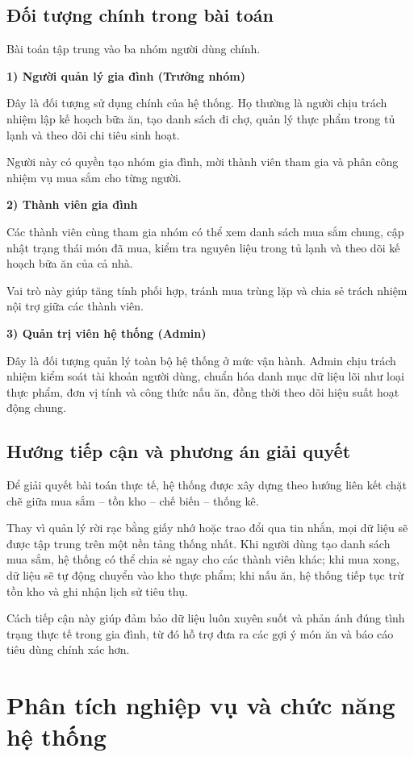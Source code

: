 \documentclass[12pt,a4paper]{report}
\begin{document}
\section{Đối tượng chính trong bài toán}
Bài toán tập trung vào ba nhóm người dùng chính.  

\textbf{1) Người quản lý gia đình (Trưởng nhóm)}  

Đây là đối tượng sử dụng chính của hệ thống. Họ thường là người chịu trách nhiệm lập kế hoạch bữa ăn, tạo danh sách đi chợ, quản lý thực phẩm trong tủ lạnh và theo dõi chi tiêu sinh hoạt.  

Người này có quyền tạo nhóm gia đình, mời thành viên tham gia và phân công nhiệm vụ mua sắm cho từng người.  

\textbf{2) Thành viên gia đình}  

Các thành viên cùng tham gia nhóm có thể xem danh sách mua sắm chung, cập nhật trạng thái món đã mua, kiểm tra nguyên liệu trong tủ lạnh và theo dõi kế hoạch bữa ăn của cả nhà.  

Vai trò này giúp tăng tính phối hợp, tránh mua trùng lặp và chia sẻ trách nhiệm nội trợ giữa các thành viên.  

\textbf{3) Quản trị viên hệ thống (Admin)}  

Đây là đối tượng quản lý toàn bộ hệ thống ở mức vận hành. Admin chịu trách nhiệm kiểm soát tài khoản người dùng, chuẩn hóa danh mục dữ liệu lõi như loại thực phẩm, đơn vị tính và công thức nấu ăn, đồng thời theo dõi hiệu suất hoạt động chung.  

\section{Hướng tiếp cận và phương án giải quyết}
Để giải quyết bài toán thực tế, hệ thống được xây dựng theo hướng liên kết chặt chẽ giữa mua sắm – tồn kho – chế biến – thống kê.  

Thay vì quản lý rời rạc bằng giấy nhớ hoặc trao đổi qua tin nhắn, mọi dữ liệu sẽ được tập trung trên một nền tảng thống nhất. Khi người dùng tạo danh sách mua sắm, hệ thống có thể chia sẻ ngay cho các thành viên khác; khi mua xong, dữ liệu sẽ tự động chuyển vào kho thực phẩm; khi nấu ăn, hệ thống tiếp tục trừ tồn kho và ghi nhận lịch sử tiêu thụ.  

Cách tiếp cận này giúp đảm bảo dữ liệu luôn xuyên suốt và phản ánh đúng tình trạng thực tế trong gia đình, từ đó hỗ trợ đưa ra các gợi ý món ăn và báo cáo tiêu dùng chính xác hơn.


\chapter{Phân tích nghiệp vụ và chức năng hệ thống}
\end{document}
